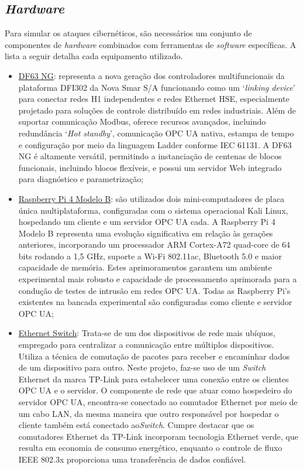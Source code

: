     \subsection{\textit{Hardware}}

    Para simular os ataques cibernéticos, são necessários um conjunto de componentes de \textit{hardware} combinados com ferramentas de \textit{software} específicas. A lista a seguir detalha cada equipamento utilizado.

    \begin{itemize}
        \item \underline{DF63 NG}: representa a nova geração dos controladores multifuncionais da plataforma DFI302 da Nova Smar S/A funcionando como um `\textit{linking device}' para conectar redes H1 independentes e redes Ethernet HSE, especialmente projetado para soluções de controle distribuído em redes industriais. Além de suportar comunicação Modbus, oferece recursos avançados, incluindo redundância `\textit{Hot standby}', comunicação OPC UA nativa, estampa de tempo e configuração por meio da linguagem Ladder conforme IEC 61131. A DF63 NG é altamente versátil, permitindo a instanciação de centenas de blocos funcionais, incluindo blocos flexíveis, e possui um servidor Web integrado para diagnóstico e parametrização;
        \item \underline{Raspberry Pi 4 Modelo B}: são utilizados dois mini-computadores de placa única multiplataforma, configuradas com o sistema operacional Kali Linux, hospedando um cliente e um servidor OPC UA cada. A Raspberry Pi 4 Modelo B representa uma evolução significativa em relação às gerações anteriores, incorporando um processador ARM Cortex-A72 quad-core de 64 bits rodando a 1,5 GHz, suporte a Wi-Fi 802.11ac, Bluetooth 5.0 e maior capacidade de memória. Estes aprimoramentos garantem um ambiente experimental mais robusto e capacidade de processamento aprimorada para a condução de testes de intrusão em redes OPC UA. Todas as Raspberry Pi's existentes na bancada experimental são configuradas como cliente e servidor OPC UA;
        \item \underline{Ethernet Switch}: Trata-se de um dos dispositivos de rede mais ubíquos, empregado para centralizar a comunicação entre múltiplos dispositivos. Utiliza a técnica de comutação de pacotes para receber e encaminhar dados de um dispositivo para outro. Neste projeto, faz-se uso de um \textit{Switch} Ethernet da marca TP-Link para estabelecer uma conexão entre os clientes OPC UA e o servidor. O componente de rede que atuar como hospedeiro do servidor OPC UA, encontra-se conectado ao comutador Ethernet por meio de um cabo LAN, da mesma maneira que outro responsável por hospedar o cliente também está conectado ao\textit{Switch}. Cumpre destacar que os comutadores Ethernet da TP-Link incorporam tecnologia Ethernet verde, que resulta em economia de consumo energético, enquanto o controle de fluxo IEEE 802.3x proporciona uma transferência de dados confiável.

\end{itemize}
